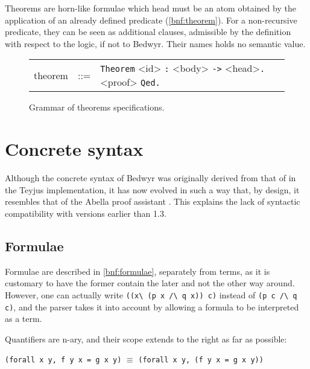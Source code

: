 Theorems are horn-like formulae which head must be an atom obtained by
the application of an already defined predicate (\autoref{bnf:theorem}).
For a non-recursive predicate, they can be seen as additional clauses,
admissible by the definition with respect to the logic, if not to
Bedwyr.  Their names holds no semantic value.
\begin{figure}[ht]
  \centering
  \begin{tabular}{lrl}
    theorem &::=& \lstinline!Theorem! <id> \lstinline!:! <body>
                  \lstinline!->!  <head>\lstinline!.!
                  <proof> \lstinline!Qed.! \\
  \end{tabular}
  \caption{Grammar of theorems specifications.\label{bnf:theorem}}
\end{figure}


\section{Concrete syntax}

Although the concrete syntax of Bedwyr was originally derived from that
of \lp{} in the Teyjus implementation\cite{nadathur99cade}, it has now
evolved in such a way that, by design, it resembles that of the Abella
proof assistant \cite{abella.website}.  This explains the lack of
syntactic compatibility with versions earlier than 1.3.

\subsection{Formulae}

Formulae are described in \autoref{bnf:formulae}, separately from terms,
as it is customary to have the former contain the later and not the
other way around.  However, one can actually write
\lstinline{((x\ (p x /\ q x)) c)} instead of \lstinline{(p c /\ q c)},
and the parser takes it into account by allowing a formula to be
interpreted as a term.

Quantifiers are n-ary, and their scope extends to the
right as far as possible:
\begin{center}
  \lstinline{(forall x y, f y x = g x y)} $\equiv$
  \lstinline{(forall x y, (f y x = g x y))}
\end{center}

